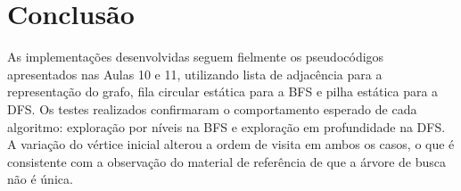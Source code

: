 \documentclass[12pt,a4paper]{article}
\begin{document}
\section{Conclusão}

As implementações desenvolvidas seguem fielmente os pseudocódigos apresentados
nas Aulas 10 e 11, utilizando lista de adjacência para a representação do grafo,
fila circular estática para a BFS e pilha estática para a DFS. Os testes
realizados confirmaram o comportamento esperado de cada algoritmo: exploração
por níveis na BFS e exploração em profundidade na DFS. A variação do vértice
inicial alterou a ordem de visita em ambos os casos, o que é consistente com
a observação do material de referência de que a árvore de busca não é única.
\end{document}
